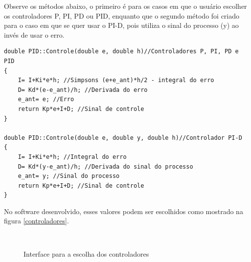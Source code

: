 \documentclass[a4paper,12pt]{article}
\begin{document}
\hspace{4ex}Observe os métodos abaixo, o primeiro é para os casos em que o usuário escolher os controladores P, PI, PD ou PID, enquanto que o segundo método foi criado para o caso em que se quer usar o PI-D, pois utiliza o sinal do processo (y) ao invés de usar o erro.
\begin{lstlisting}
double PID::Controle(double e, double h)//Controladores P, PI, PD e PID
{
    I= I+Ki*e*h; //Simpsons (e+e_ant)*h/2 - integral do erro
    D= Kd*(e-e_ant)/h; //Derivada do erro
    e_ant= e; //Erro
    return Kp*e+I+D; //Sinal de controle
}

double PID::Controle(double e, double y, double h)//Controlador PI-D
{
    I= I+Ki*e*h; //Integral do erro
    D= Kd*(y-e_ant)/h; //Derivada do sinal do processo
    e_ant= y; //Sinal do processo
    return Kp*e+I+D; //Sinal de controle
}
\end{lstlisting}
\hspace{4ex}No software desenvolvido, esses valores podem ser escolhidos como mostrado na figura \ref{controladores}.

\begin{figure}[H]
     \centering
     \hspace{4ex}
     \\
     \caption{Interface para a escolha dos controladores}
     \label{fig:controladores}
\end{figure}
\end{document}

